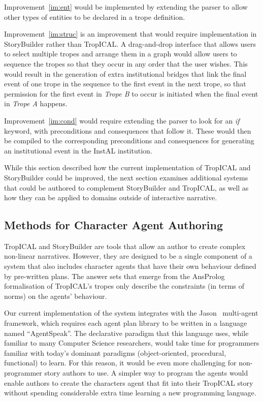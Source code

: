 \documentclass[11pt]{report}
\begin{document}
Improvement~\ref{im:ent} would be implemented by extending the parser to allow
other types of entities to be declared in a trope definition.

Improvement~\ref{im:struc} is an improvement that would require implementation
in StoryBuilder rather than TropICAL. A drag-and-drop interface that allows
users to select multiple tropes and arrange them in a graph would allow users to
sequence the tropes so that they occur in any order that the user wishes. This would
result in the generation of extra institutional bridges that link the final
event of one trope in the sequence to the first event in the next trope, so that
permission for the first event in \emph{Trope B} to occur is initiated when the
final event in \emph{Trope A} happens.

Improvement~\ref{im:cond} would require extending the parser to look for an
\emph{if} keyword, with preconditions and consequences that follow it. These
would then be compiled to the corresponding preconditions and consequences for
generating an institutional event in the InstAL institution.

While this section described how the current implementation of TropICAL and
StoryBuilder could be improved, the next section examines additional systems that could be
authored to complement StoryBuilder and TropICAL, as well as how they can be
applied to domains outside of interactive narrative.

\subsection{Methods for Character Agent Authoring}
\label{sec:future-agent}
TropICAL and StoryBuilder are tools that allow an author to create complex
non-linear narratives. However, they are designed to be a single component of a
system that also includes character agents that have their own behaviour defined
by pre-written plans. The answer sets that emerge from the AnsProlog
formalisation of TropICAL's tropes only describe the constraints (in terms of
norms) on the agents' behaviour.

Our current implementation of the system integrates with the Jason~\citep{bordini2007programming} multi-agent
framework, which requires each agent plan library to be written in a language
named ``AgentSpeak''. The declarative paradigm that this language uses, while
familiar to many Computer Science researchers, would take time for programmers
familiar with today's dominant paradigms (object-oriented, procedural,
functional) to learn. For this reason, it would be even more challenging for
non-programmer story authors to use. A simpler way to program the agents would
enable authors to create the characters agent that fit into their TropICAL story
without spending considerable extra time learning a new programming language.
\end{document}
